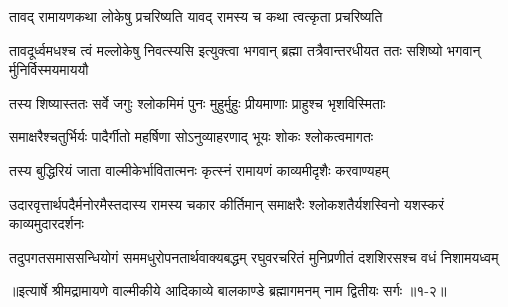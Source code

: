 \twolineshloka
{तावद् रामायणकथा लोकेषु प्रचरिष्यति}
{यावद् रामस्य च कथा त्वत्कृता प्रचरिष्यति} %

\threelineshloka
{तावदूर्ध्वमधश्च त्वं मल्लोकेषु निवत्स्यसि}
{इत्युक्त्वा भगवान् ब्रह्मा तत्रैवान्तरधीयत}
{ततः सशिष्यो भगवान् र्मुनिर्विस्मयमाययौ} %

\twolineshloka
{तस्य शिष्यास्ततः सर्वे जगुः श्लोकमिमं पुनः}
{मुहुर्मुहुः प्रीयमाणाः प्राहुश्च भृशविस्मिताः} %

\twolineshloka
{समाक्षरैश्चतुर्भिर्यः पादैर्गीतो महर्षिणा}
{सोऽनुव्याहरणाद् भूयः शोकः श्लोकत्वमागतः} %

\twolineshloka
{तस्य बुद्धिरियं जाता वाल्मीकेर्भावितात्मनः}
{कृत्स्नं रामायणं काव्यमीदृशैः करवाण्यहम्} %

\twolineshloka
{उदारवृत्तार्थपदैर्मनोरमैस्तदास्य रामस्य चकार कीर्तिमान्}
{समाक्षरैः श्लोकशतैर्यशस्विनो यशस्करं काव्यमुदारदर्शनः} %

\fourlineindentedshloka
{तदुपगतसमाससन्धियोगं}
{सममधुरोपनतार्थवाक्यबद्धम्}
{रघुवरचरितं मुनिप्रणीतं}
{दशशिरसश्च वधं निशामयध्वम्} %


॥इत्यार्षे श्रीमद्रामायणे वाल्मीकीये आदिकाव्ये बालकाण्डे ब्रह्मागमनम् नाम द्वितीयः सर्गः ॥१-२॥
